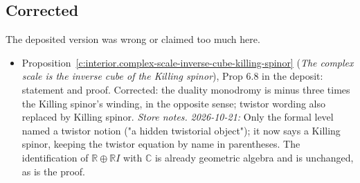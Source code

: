 \documentclass[11pt]{article}
\theoremstyle{definition}
\theoremstyle{plain}
\providecommand{\C}{}\renewcommand{\C}{\mathbb{C}}
\providecommand{\R}{}\renewcommand{\R}{\mathbb{R}}
\begin{document}
\subsection*{Corrected}
The deposited version was wrong or claimed too much here.
\begin{itemize}\setlength{\itemsep}{2pt}
\item Proposition~\ref{c:interior.complex-scale-inverse-cube-killing-spinor} (\emph{The complex scale is the inverse cube of the Killing spinor}), Prop 6.8 in the deposit: statement and proof. Corrected: the duality monodromy is minus three times the Killing spinor's winding, in the opposite sense; twistor wording also replaced by Killing spinor. \emph{Store notes.} \emph{2026-10-21:} Only the formal level named a twistor notion ("a hidden twistorial object"); it now says a Killing spinor, keeping the twistor equation by name in parentheses. The identification of $\R \oplus \R I$ with $\C$ is already geometric algebra and is unchanged, as is the proof.
\end{itemize}
\end{document}
